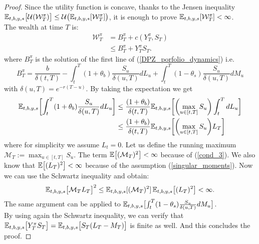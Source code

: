 \begin{proof}
 Since the utility function is concave, thanks to the Jensen inequality $\mathbb{E}_{t,b,y,s} \bigl[\mathcal{U}(\mathcal{W}^{\pi}_T)\bigr] \leq 
 \mathcal{U}\bigl( \mathbb{E}_{t,b,y,s}[\mathcal{W}^{\pi}_T] \bigr)$,
 it is enough to prove $\mathbb{E}_{t,b,y,s}[\mathcal{W}^{\pi}_T] < \infty$.\\
 The wealth at time $T$ is:
 \begin{align*}
   \mathcal{W}^{\pi}_T &=  B^{\pi}_T + c(Y^{\pi}_T,S_T) \\
                       &\leq B^{\pi}_T + Y^{\pi}_T S_T.
 \end{align*}
 where $B^{\pi}_T$ is the solution of the first line of (\ref{DPZ_porfolio_dynamics}) i.e.
 \begin{equation*}
 B^{\pi}_T =  \frac{b}{\delta(t,T)} - \int_{t}^T
 (1+\theta_b)\frac{S_u}{\delta(u,T)} dL_u + \int_{t}^T
 (1-\theta_s) \frac{S_u}{\delta(u,T)} dM_u 
 \end{equation*}
 with $\delta(u,T) = e^{-r(T-u)}$.  
 By taking the expectation we get
 \begin{align*}
 \mathbb{E}_{t,b,y,s}\biggl[ \int_{t}^T (1+\theta_b)\frac{S_u}{\delta(u,T)} dL_u  \biggr] & \leq \frac{(1+\theta_b)}{\delta(t,T)} 
                                                                                    \mathbb{E}_{t,b,y,s}\biggl[ \biggl(\max_{u\in[t,T]} S_u \biggr)\int_{t}^T dL_u  \biggr] \\
                                                                                &\leq \frac{(1+\theta_b)}{\delta(t,T)} \mathbb{E}_{t,b,y,s}\biggl[ \biggl(\max_{u\in[t,T]} S_u \biggr) L_T  \biggr] 
 \end{align*}
where for simplicity we assume $L_t=0$.
Let us define the running maximum $\mathcal{M}_T := \max_{u\in[t,T]} S_{u}$. 
The term $\mathbb{E} \bigl[ (\mathcal{M}_T)^2 \bigr] < \infty$ because of (\ref{cond_3}).
We also know that $\mathbb{E} \bigl[ (L_T)^2 \bigr] < \infty $ because of the assumption (\ref{singular_moments}).
Now we can use the Schwartz inequality and obtain:
\begin{equation}
  \mathbb{E}_{t,b,y,s} \bigl[ \mathcal{M}_T L_T \bigr]^2  \leq \mathbb{E}_{t,b,y,s}[(\mathcal{M}_T)^2] \, \mathbb{E}_{t,b,y,s} \bigl[ (L_T)^2 \bigr] < \infty.
\end{equation}
The same argument can be applied to $\mathbb{E}_{t,b,y,s}\bigl[ \int_{t}^T (1-\theta_s) \frac{S_u}{\delta(u,T)} dM_u \bigr]$.\\
By using again the Schwartz inequality, we can verify that $\mathbb{E}_{t,b,y,s}\bigl[ Y^{\pi}_T S_T \bigr] = \mathbb{E}_{t,b,y,s}\bigl[ S_T(L_T - M_T) \bigr]$ is finite as well.
And this concludes the proof.
\end{proof}



